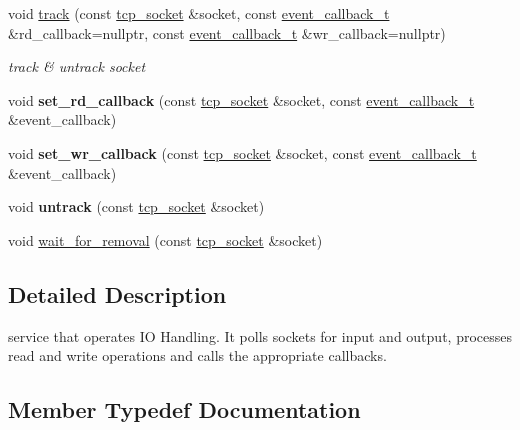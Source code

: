 \begin{DoxyCompactItemize}
void \hyperlink{classtacopie_1_1io__service_a9f4c8bce3c0f6d660515b0b5eb109df8}{track} (const \hyperlink{classtacopie_1_1tcp__socket}{tcp\+\_\+socket} \&socket, const \hyperlink{classtacopie_1_1io__service_abb66850c32d9c724f4418d77bd04bcfd}{event\+\_\+callback\+\_\+t} \&rd\+\_\+callback=nullptr, const \hyperlink{classtacopie_1_1io__service_abb66850c32d9c724f4418d77bd04bcfd}{event\+\_\+callback\+\_\+t} \&wr\+\_\+callback=nullptr)
\begin{DoxyCompactList}\small\item\em track \& untrack socket \end{DoxyCompactList}\item 
\mbox{\label{classtacopie_1_1io__service_a8094c1fec76c6821cc0c008fe524c89a}} 
void {\bfseries set\+\_\+rd\+\_\+callback} (const \hyperlink{classtacopie_1_1tcp__socket}{tcp\+\_\+socket} \&socket, const \hyperlink{classtacopie_1_1io__service_abb66850c32d9c724f4418d77bd04bcfd}{event\+\_\+callback\+\_\+t} \&event\+\_\+callback)
\item 
\mbox{\label{classtacopie_1_1io__service_a7c4f56c7790c7ba52b09837a42aaffb1}} 
void {\bfseries set\+\_\+wr\+\_\+callback} (const \hyperlink{classtacopie_1_1tcp__socket}{tcp\+\_\+socket} \&socket, const \hyperlink{classtacopie_1_1io__service_abb66850c32d9c724f4418d77bd04bcfd}{event\+\_\+callback\+\_\+t} \&event\+\_\+callback)
\item 
\mbox{\label{classtacopie_1_1io__service_a9a7672f0894a0fc1a3e6c593ca6df22c}} 
void {\bfseries untrack} (const \hyperlink{classtacopie_1_1tcp__socket}{tcp\+\_\+socket} \&socket)
\item 
void \hyperlink{classtacopie_1_1io__service_aa57db619baeaa6db0aeb22e67b895cd7}{wait\+\_\+for\+\_\+removal} (const \hyperlink{classtacopie_1_1tcp__socket}{tcp\+\_\+socket} \&socket)
\end{DoxyCompactItemize}


\subsection{Detailed Description}
service that operates IO Handling. It polls sockets for input and output, processes read and write operations and calls the appropriate callbacks. 

\subsection{Member Typedef Documentation}
\mbox{\label{classtacopie_1_1io__service_abb66850c32d9c724f4418d77bd04bcfd}} 
